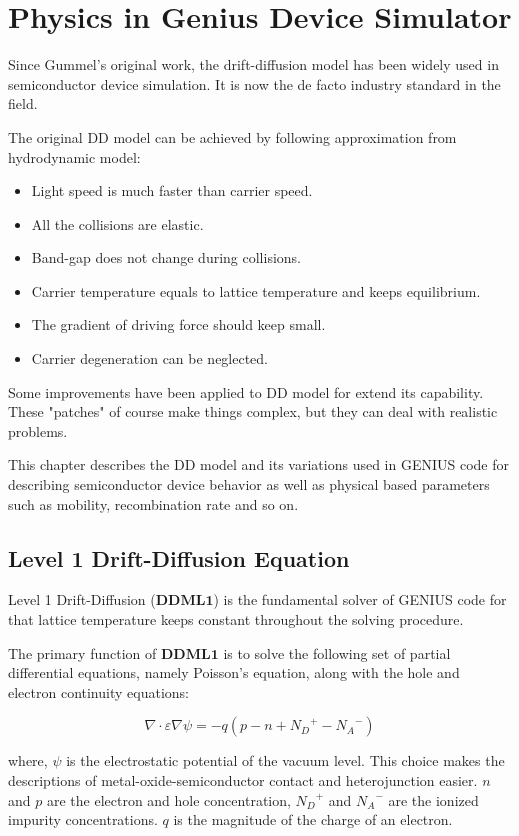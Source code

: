 \chapter{Physics in Genius Device Simulator}

Since Gummel's original work, the drift-diffusion model has been widely used in semiconductor device simulation.  It is now the de facto industry standard in the field.

The original DD model can be achieved by following approximation from hydrodynamic model:
\begin{itemize}
\item Light speed is much faster than carrier speed.
\item All the collisions are elastic.
\item Band-gap does not change during collisions.
\item Carrier temperature equals to lattice temperature and keeps equilibrium.
\item The gradient of driving force should keep small.
\item Carrier degeneration can be neglected.
\end{itemize}

Some improvements have been applied to DD model for extend its capability.  These "patches" of course make things complex, but they can deal with realistic problems.

This chapter describes the DD model and its variations used in GENIUS code for describing semiconductor device behavior as well as physical based parameters such as mobility, recombination rate and so on.

\section{Level 1 Drift-Diffusion Equation}
\label{sec:Equation:DDML1}
Level 1 Drift-Diffusion ($\mathbf{DDML1}$) is the fundamental solver of GENIUS code for that lattice temperature keeps constant throughout the solving procedure.

The primary function of $\mathbf{DDML1}$ is to solve the following set of partial differential equations, namely Poisson's equation, along with the hole and electron continuity equations:

\begin{equation}
\nabla \cdot \varepsilon \nabla \psi = - q\left( p - n + {N_D}^+ - {N_A}^- \right)
\end{equation}
\par
\par
{}where, $\psi$ is the electrostatic potential of the vacuum level. This choice makes the descriptions of metal-oxide-semiconductor contact and heterojunction easier. $n$ and $p$ are the electron and hole concentration, ${N_D}^{+}$ and ${N_A}^{-}$ are the ionized impurity concentrations. $q$ is the magnitude of the charge of an electron.

